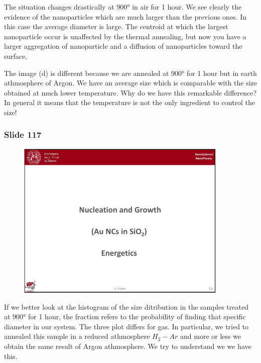 \documentclass[../main/main.tex]{subfiles}
\begin{document}
The situation changes drastically at \( 900° \) in air for 1 hour. We see clearly the evidence of the nanoparticles which are much larger than the previous ones. In this case the average diameter is large.
The centroid at which the largest nanoparticle occur is unaffected by the thermal annealing, but now you have a larger aggregation of nanoparticle and a diffusion of nanoparticles toward the surface.

The image (d) is different because we are annealed at \( 900° \) for 1 hour but in earth athmosphere of Argon. We have an average size which is comparable with  the size obtained at much lower temperature. Why do we have this remarkable difference?
In general it means that the temperature is not the only ingredient to control the size!

\newpage

\subsubsection{Slide 117}

\begin{figure}[h!]
\centering
\includegraphics[page=3,width=0.9\textwidth]{../lessons/pdf_file/8_lesson.pdf}
\end{figure}

If we better look at the histogram of the size ditribution in the samples treated at \( 900° \) for 1 hour, the fraction refers to the probability of finding that specific diameter in our system. The three plot differs for gas.  In particular, we tried to annealed this sample in a reduced athmosphere \( H_2-Ar \) and more or less we obtain the same result of Argon athmosphere. We try to understand we we have this.
\end{document}
